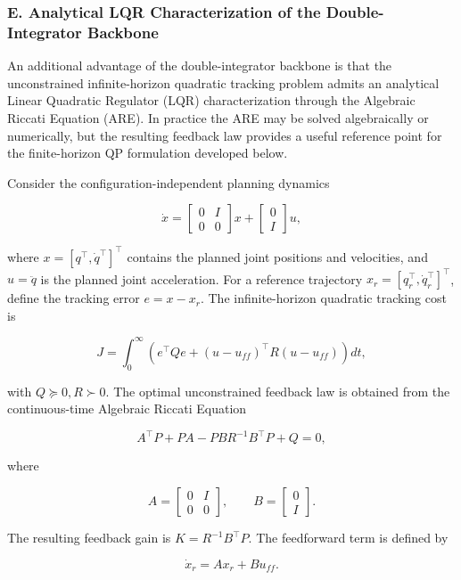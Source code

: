 \subsubsection{E. Analytical LQR Characterization of the
Double-Integrator
Backbone}\label{e.-analytical-lqr-characterization-of-the-double-integrator-backbone}

An additional advantage of the double-integrator backbone is that the
unconstrained infinite-horizon quadratic tracking problem admits an
analytical Linear Quadratic Regulator (LQR) characterization through the
Algebraic Riccati Equation (ARE). In practice the ARE may be solved
algebraically or numerically, but the resulting feedback law provides a
useful reference point for the finite-horizon QP formulation developed
below.

Consider the configuration-independent planning dynamics

\[\dot x = \begin{bmatrix} 0&I \\ 0&0 \end{bmatrix} x +
\begin{bmatrix} 0 \\ I \end{bmatrix} u,\]

where \(x= [q^\top, \dot q ^\top ]^\top\) contains the planned joint
positions and velocities, and \(u=\ddot q\) is the planned joint
acceleration. For a reference trajectory
\(x_r=[q_r^\top,\dot q_r^\top]^\top\), define the tracking error
\(e=x-x_r\). The infinite-horizon quadratic tracking cost is

\[ J = \int_0^\infty \left ( e^\top Q e + (u-u_{ff})^\top R (u-u_{ff}) \right )dt,\]

with \(Q \succeq 0, R \succ 0\). The optimal unconstrained feedback law
is obtained from the continuous-time Algebraic Riccati Equation

\[ A^\top P + PA - PB R^{-1} B^\top P + Q = 0, \]

where

\[ A= \begin{bmatrix} 0&I\\ 0&0 \end{bmatrix},\qquad
B= \begin{bmatrix} 0\\ I \end{bmatrix}.\]

The resulting feedback gain is \(K = R^{-1}B^\top P.\) The feedforward
term is defined by

\[ \dot x_r = A x_r + B u_{ff}. \]

